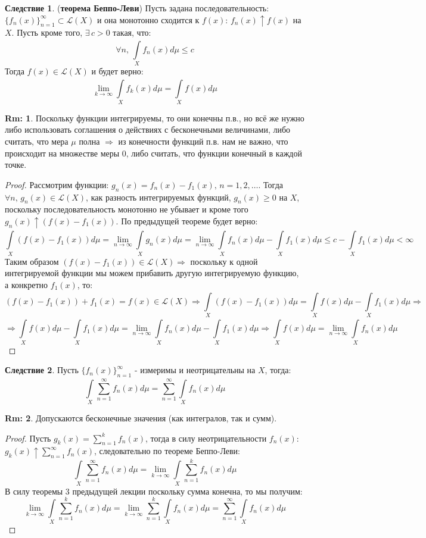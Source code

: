 \documentclass[12pt]{article}
\newcommand{\ML}{\mathcal{L}}
\theoremstyle{definition}
\newtheorem{rem}{Rm:}
\newtheorem{corollary}{Следствие}
\newcommand{\ddsum}[2]{\displaystyle\sum\limits_{#1}^{#2}}
\newcommand{\ddint}[2]{\displaystyle\int\limits_{#1}^{#2}}
\begin{document}
\begin{corollary}(\textbf{теорема Беппо-Леви})
	Пусть задана последовательность: $\{f_n(x)\}_{n = 1}^{\infty}\subset \ML(X)$ и она монотонно сходится к $f(x)$: $f_n(x) \uparrow f(x)$ на $X$. Пусть кроме того, $\exists \, c > 0$ такая, что:
	$$
		\forall n, \, \ddint{X}{}f_n(x)d\mu \leq c 
	$$
	Тогда $f(x) \in \ML(X)$ и будет верно:
	$$
		\lim\limits_{k \to \infty}\ddint{X}{}f_k(x)d\mu = \ddint{X}{}f(x)d\mu
	$$
\end{corollary}
\begin{rem}
	Поскольку функции интегрируемы, то они конечны п.в., но всё же нужно либо использовать соглашения о действиях с бесконечными величинами, либо считать, что мера $\mu$ полна $\Rightarrow$ из конечности функций п.в. нам не важно, что происходит на множестве меры $0$, либо считать, что функции конечный в каждой точке.
\end{rem}
\begin{proof}
	Рассмотрим функции: $g_n(x) = f_n(x) - f_1(x), \, n = 1,2, \dotsc$. Тогда $\forall n, \, g_n(x) \in \ML(X)$, как разность интегрируемых функций, $g_n(x) \geq 0$ на $X$, поскольку последовательность монотонно не убывает и кроме того $g_n(x) \uparrow (f(x) - f_1(x))$. По предыдущей теореме будет верно:
	$$
		\ddint{X}{}(f(x) - f_1(x))d\mu = \lim\limits_{n \to \infty}\ddint{X}{}g_n(x)d\mu = \lim\limits_{n \to \infty}\ddint{X}{}f_n(x)d\mu - \ddint{X}{}f_1(x)d\mu \leq c -  \ddint{X}{}f_1(x)d\mu < \infty
	$$
	Таким образом $(f(x) - f_1(x)) \in \ML(X) \Rightarrow$ поскольку к одной интегрируемой функции мы можем прибавить другую интегрируемую функцию, а конкретно $f_1(x)$, то: 
	$$
		(f(x) - f_1(x)) + f_1(x) = f(x) \in \ML(X) \Rightarrow \ddint{X}{}(f(x) - f_1(x))d\mu = \ddint{X}{}f(x)d\mu - \ddint{X}{}f_1(x)d\mu \Rightarrow
	$$
	$$
		\Rightarrow \ddint{X}{}f(x)d\mu - \ddint{X}{}f_1(x)d\mu =  \lim\limits_{n \to \infty}\ddint{X}{}f_n(x)d\mu - \ddint{X}{}f_1(x)d\mu \Rightarrow \ddint{X}{}f(x)d\mu  =  \lim\limits_{n \to \infty}\ddint{X}{}f_n(x)d\mu
	$$
\end{proof}
\begin{corollary}
	Пусть $\{f_n(x)\}_{n = 1}^{\infty}$ - измеримы и неотрицательны на $X$, тогда:
	$$
		\ddint{X}{}\ddsum{n = 1}{\infty}f_n(x)d\mu = \ddsum{n = 1}{\infty}\ddint{X}{}f_n(x)d\mu
	$$
\end{corollary}
\begin{rem}
	Допускаются бесконечные значения (как интегралов, так и сумм).
\end{rem}
\begin{proof}
	Пусть $g_k(x) = \sum_{n = 1}^{k}f_n(x)$, тогда в силу неотрицательности $f_n(x)$: $g_k(x) \uparrow \sum_{n = 1}^{\infty}f_n(x)$, следовательно по теореме Беппо-Леви:
	$$
		\ddint{X}{}\ddsum{n = 1}{\infty}f_n(x)d\mu = \lim\limits_{k \to \infty}\ddint{X}{}\ddsum{n = 1}{k}f_n(x)d\mu
	$$
	В силу теоремы $3$ предыдущей лекции поскольку сумма конечна, то мы получим:
	$$
		\lim\limits_{k \to \infty}\ddint{X}{}\ddsum{n = 1}{k}f_n(x)d\mu = \lim\limits_{k \to \infty}\ddsum{n = 1}{k}\ddint{X}{}f_n(x)d\mu = \ddsum{n = 1}{\infty}\ddint{X}{}f_n(x)d\mu
	$$
\end{proof}
\end{document}
